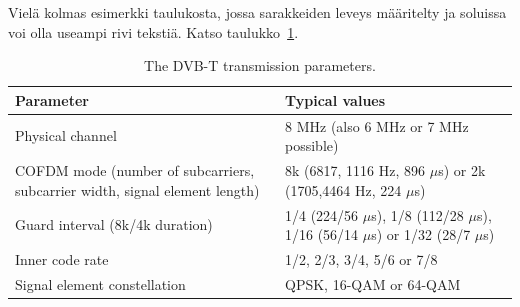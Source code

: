 Vielä kolmas esimerkki taulukosta, jossa sarakkeiden leveys määritelty
ja soluissa voi olla useampi rivi tekstiä. Katso
taulukko~\ref{table:dvbt_param}.

\begin{table}[th]
\caption{The DVB-T transmission parameters.}
\label{table:dvbt_param}
\begin{center}
\begin{tabular}{|p{}|p{}|} 
    \hline
Parameter & Typical values \\
    \hline
    \hline
Physical channel&8 MHz (also 6 MHz or 7 MHz possible)\\ 
    \hline
COFDM mode (number of subcarriers, 
subcarrier width, 
signal element length)
&8k (6817, 1116 Hz, 896 $\mu$s) or 
2k (1705,4464 Hz, 224 $\mu$s)\\
    \hline
Guard interval (8k/4k duration)
&1/4 (224/56 $\mu$s), 1/8 (112/28 $\mu$s),
   1/16 (56/14 $\mu$s) or 1/32 (28/7 $\mu$s)\\
    \hline
Inner code rate &1/2, 2/3, 3/4, 5/6 or 7/8\\
    \hline
Signal  element constellation 
&QPSK, 16-QAM or 64-QAM \\
    \hline
\end{tabular}
\end{center}
\end{table}


